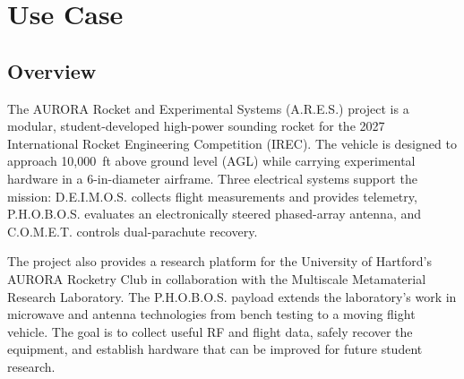 \documentclass[11pt]{IEEEtran}
\newcommand{\comet}{C.O.M.E.T.}
\newcommand{\ares}{A.R.E.S.}
\newcommand{\phobos}{P.H.O.B.O.S.}
\newcommand{\deimos}{D.E.I.M.O.S.}
\begin{document}
\onecolumn


\section{Use Case}
\subsection{Overview}
The AURORA Rocket and Experimental Systems (\ares{}) project is a modular, student-developed high-power sounding rocket for the 2027 International Rocket Engineering Competition (IREC). The vehicle is designed to approach 10,000~ft above ground level (AGL) while carrying experimental hardware in a 6-in-diameter airframe. Three electrical systems support the mission: \deimos{} collects flight measurements and provides telemetry, \phobos{} evaluates an electronically steered phased-array antenna, and \comet{} controls dual-parachute recovery.

The project also provides a research platform for the University of Hartford's AURORA Rocketry Club in collaboration with the Multiscale Metamaterial Research Laboratory. The \phobos{} payload extends the laboratory's work in microwave and antenna technologies from bench testing to a moving flight vehicle. The goal is to collect useful RF and flight data, safely recover the equipment, and establish hardware that can be improved for future student research.
\end{document}
